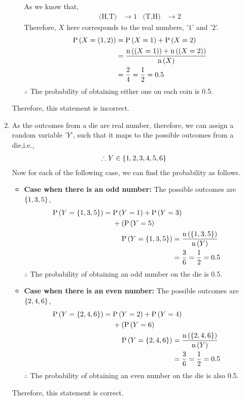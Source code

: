 \documentclass[journal,12pt,twocolumn]{IEEEtran}
\begin{document}
\begin{enumerate}[label=(\roman*)]
\begin{itemize}
    As we know that,
    \begin{align*}
    \text{(H,T)}&\rightarrow 1 &  \text{(T,H)}&\rightarrow 2
    \end{align*}
    Therefore, $X$ here corresponds to the real numbers, '$1$' and '$2$'.
    \begin{align}
    \text{P}\left(X = \left(1, 2\right)\right) &= \text{P}\left(X = 1\right) + \text{P}\left(X = 2\right)\\
    &= \frac{\text{n}\left(\left(X = 1\right)\right) + \text{n}\left(\left(X = 2\right)\right)}{\text{n}\left(X\right)}\\
                                              &= \frac{2}{4} = \frac{1}{2} = 0.5
    \end{align}
    $\therefore$ The probability of obtaining either one on each coin is 0.5.
    \end{itemize}
    Therefore, this statement is incorrect.
    \item As the outcomes from a die are real number, therefore, we can assign a random variable '$Y$', such that it maps to the possible outcomes from a die,i.e.,
    \begin{align*}
    \therefore Y \in \left\{1,2,3,4,5,6\right\}
    \end{align*}
    Now for each of the following case, we can find the probability as follows.      
    \begin{itemize}
    \item \textbf{Case when there is an odd number:} The possible outcomes are $\left\{1,3,5\right\}$,
    \begin{align}
    \begin{split}
  \text{P}\left(Y = \left\{1,3,5\right\}\right) ={}& \text{P}\left(Y = 1\right) + \text{P}\left(Y = 3\right)\\
                                      & + (\text{P}\left(Y = 5\right)
    \end{split}\\
  \text{P}\left(Y = \left\{1,3,5\right\}\right) ={}& \frac{\text{n}\left(\left\{1,3,5\right\}\right)}{\text{n}\left(Y\right)}\\
                                   ={}& \frac{3}{6} = \frac{1}{2} = 0.5
    \end{align}
    $\therefore$ The probability of obtaining an odd number on the die is 0.5.
    \item \textbf{Case when there is an even number:} The possible outcomes are $\left\{2,4,6\right\}$,
    \begin{align}
    \begin{split}
  \text{P}\left(Y = \left\{2,4,6\right\}\right) ={}& \text{P}\left(Y = 2\right) + \text{P}\left(Y = 4\right)\\
                                      & + (\text{P}\left(Y = 6\right)
    \end{split}\\
  \text{P}\left(Y = \left\{2,4,6\right\}\right) ={}& \frac{\text{n}\left(\left\{2,4,6\right\}\right)}{\text{n}\left(Y\right)}\\
                                   ={}& \frac{3}{6} = \frac{1}{2} = 0.5
    \end{align}
    $\therefore$ The probability of obtaining an even number on the die is also 0.5.
    \end{itemize}
    Therefore, this statement is correct.
	\end{enumerate}
\end{document}
